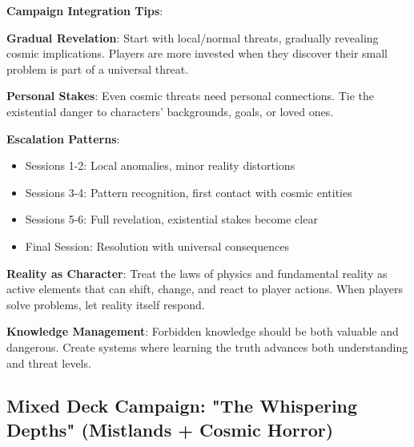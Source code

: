 \documentclass[11pt]{article}
\begin{document}
\begin{mdframed}[backgroundcolor=horrorbg]
\textbf{Campaign Integration Tips}:

\textbf{Gradual Revelation}:
Start with local/normal threats, gradually revealing cosmic implications. Players are more invested when they discover their small problem is part of a universal threat.

\textbf{Personal Stakes}:
Even cosmic threats need personal connections. Tie the existential danger to characters' backgrounds, goals, or loved ones.

\textbf{Escalation Patterns}:
\begin{itemize}[leftmargin=*]
\item Sessions 1-2: Local anomalies, minor reality distortions
\item Sessions 3-4: Pattern recognition, first contact with cosmic entities
\item Sessions 5-6: Full revelation, existential stakes become clear
\item Final Session: Resolution with universal consequences
\end{itemize}

\textbf{Reality as Character}:
Treat the laws of physics and fundamental reality as active elements that can shift, change, and react to player actions. When players solve problems, let reality itself respond.

\textbf{Knowledge Management}:
Forbidden knowledge should be both valuable and dangerous. Create systems where learning the truth advances both understanding and threat levels.
\end{mdframed}

\subsection*{Mixed Deck Campaign: "The Whispering Depths" (Mistlands + Cosmic Horror)}
\end{document}

